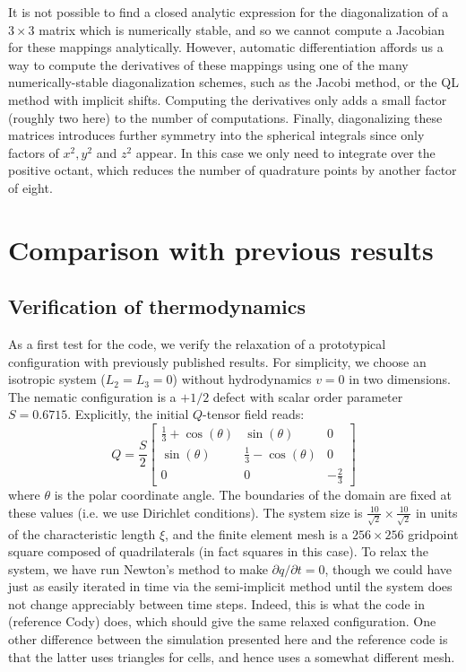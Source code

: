 \documentclass[reqno]{article}
\begin{document}
  It is not possible to find a closed analytic expression for the
  diagonalization of a $3\times 3$ matrix which is numerically stable, and so
  we cannot compute a Jacobian for these mappings analytically.
  However, automatic differentiation affords us a way to compute the derivatives
  of these mappings using one of the many numerically-stable diagonalization
  schemes, such as the Jacobi method, or the QL method with implicit shifts.
  Computing the derivatives only adds a small factor (roughly two here) to the
  number of computations.
  Finally, diagonalizing these matrices introduces further symmetry into the
  spherical integrals since only factors of $x^2, y^2$ and $z^2$ appear.
  In this case we only need to integrate over the positive octant, which reduces
  the number of quadrature points by another factor of eight.

  \section{Comparison with previous results}
  \subsection{Verification of thermodynamics}
  As a first test for the code, we verify the relaxation of a prototypical
  configuration with previously published results.
  For simplicity, we choose an isotropic system ($L_2 = L_3 = 0$) without
  hydrodynamics $v = 0$ in two dimensions.
  The nematic configuration is a $+1/2$ defect with scalar order parameter
  $S = 0.6715$.
  Explicitly, the initial $Q$-tensor field reads:
  \begin{equation}
    Q
    =
    \frac{S}{2}
    \begin{bmatrix}
      \tfrac13 + \cos(\theta) & \sin(\theta) & 0 \\
      \sin(\theta) & \tfrac13 - \cos(\theta) & 0 \\
      0 & 0 & -\tfrac23
    \end{bmatrix}
  \end{equation}
  where $\theta$ is the polar coordinate angle.
  The boundaries of the domain are fixed at these values (i.e. we use Dirichlet
  conditions).
  The system size is $\frac{10}{\sqrt{2}} \times \frac{10}{\sqrt{2}}$ in units
  of the characteristic length $\xi$, and the finite element mesh is a $256
  \times 256$ gridpoint square composed of quadrilaterals (in fact squares in
  this case).
  To relax the system, we have run Newton's method to make $\partial q / \partial t = 0$,
  though we could have just as easily iterated in time via the semi-implicit
  method until the system does not change appreciably between time steps.
  Indeed, this is what the code in (reference Cody) does, which should give the
  same relaxed configuration.
  One other difference between the simulation presented here and the reference
  code is that the latter uses triangles for cells, and hence uses a somewhat
  different mesh.
  
\end{document}
